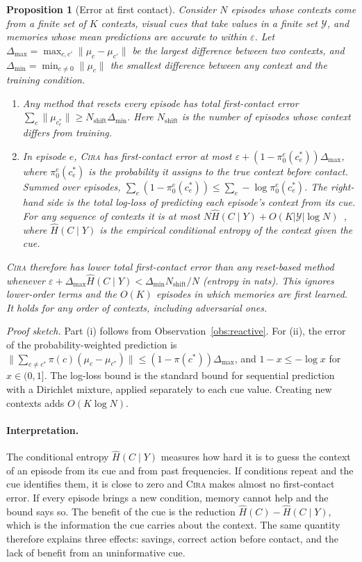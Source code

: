 \documentclass[10pt]{article}
\newtheorem{proposition}{Proposition}
\newcommand{\method}{\textsc{Cira}}
\begin{document}
\begin{proposition}[Error at first contact]\label{prop:separation}
Consider $N$ episodes whose contexts come from a finite set of $K$ contexts, visual cues that take
values in a finite set $\mathcal{Y}$, and memories whose mean predictions are accurate to within
$\varepsilon$. Let $\Delta_{\max}=\max_{c,c'}\|\mu_c-\mu_{c'}\|$ be the largest difference between two
contexts, and $\Delta_{\min}=\min_{c\ne0}\|\mu_c\|$ the smallest difference between any context and the
training condition.
\begin{enumerate}[label=(\roman*)]
  \item Any method that resets every episode has total first-contact error
  $\sum_e\|\mu_{c^\ast_e}\|\ge N_{\mathrm{shift}}\Delta_{\min}$. Here $N_{\mathrm{shift}}$ is the number
  of episodes whose context differs from training.
  \item In episode $e$, \method{} has first-contact error at most
  $\varepsilon+(1-\pi_0^e(c^\ast_e))\Delta_{\max}$, where $\pi_0^e(c^\ast_e)$ is the probability it
  assigns to the true context before contact. Summed over episodes,
  $\sum_e(1-\pi_0^e(c^\ast_e))\le\sum_e-\log\pi_0^e(c^\ast_e)$. The right-hand side is the total
  log-loss of predicting each episode's context from its cue. For any sequence of contexts it is at
  most $N\hat H(C\mid Y)+O(K|\mathcal{Y}|\log N)$~\cite{krichevsky1981performance}, where
  $\hat H(C\mid Y)$ is the empirical conditional entropy of the context given the cue.
\end{enumerate}
\method{} therefore has lower total first-contact error than any reset-based method whenever
$\varepsilon+\Delta_{\max}\hat H(C\mid Y)<\Delta_{\min}N_{\mathrm{shift}}/N$ (entropy in nats). This
ignores lower-order terms and the $O(K)$ episodes in which memories are first learned. It holds for
any order of contexts, including adversarial ones.
\end{proposition}

\noindent\emph{Proof sketch.} Part (i) follows from Observation~\ref{obs:reactive}. For (ii), the
error of the probability-weighted prediction is
$\|\sum_{c\ne c^\ast}\pi(c)(\mu_c-\mu_{c^\ast})\|\le(1-\pi(c^\ast))\Delta_{\max}$, and $1-x\le-\log x$
for $x\in(0,1]$. The log-loss bound is the standard bound for sequential prediction with a Dirichlet
mixture, applied separately to each cue value. Creating new contexts adds $O(K\log N)$.

\paragraph{Interpretation.}
The conditional entropy $\hat H(C\mid Y)$ measures how hard it is to guess the context of an episode
from its cue and from past frequencies. If conditions repeat and the cue identifies them, it is close
to zero and \method{} makes almost no first-contact error. If every episode brings a new condition,
memory cannot help and the bound says so. The benefit of the cue is the reduction
$\hat H(C)-\hat H(C\mid Y)$, which is the information the cue carries about the context. The same
quantity therefore explains three effects: savings, correct action before contact, and the lack of
benefit from an uninformative cue.
\end{document}
